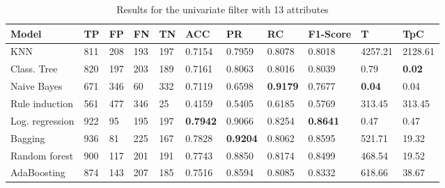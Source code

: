 \documentclass[a4paper,11pt]{article}
\begin{document}
\begin{table}
\centering

\begin{tabular}{|l|l|l|l|l|l|l|l|l|l|l|}
\hline

\textbf{Model} & \textbf{TP} & \textbf{FP} & \textbf{FN} & \textbf{TN} & \textbf{ACC} & \textbf{PR} & \textbf{RC} & \textbf{F1-Score} & \textbf{T} & \textbf{TpC} \\ \hline
KNN & 811 & 208 & 193 & 197 & 0.7154 & 0.7959 & 0.8078 & 0.8018 & 4257.21 & 2128.61 \\ \hline
Class. Tree & 820 & 197 & 203 & 189 & 0.7161 & 0.8063 & 0.8016 & 0.8039 & 0.79 & \textbf{0.02} \\ \hline
Naive Bayes & 671 & 346 & 60 & 332 & 0.7119 & 0.6598 & \textbf{0.9179} & 0.7677 & \textbf{0.04} & 0.04 \\ \hline
Rule induction & 561 & 477 & 346 & 25 & 0.4159 & 0.5405 & 0.6185 & 0.5769 & 313.45 & 313.45 \\ \hline
Log. regression & 922 & 95 & 195 & 197 & \textbf{0.7942} & 0.9066 & 0.8254 & \textbf{0.8641} & 0.47 & 0.47 \\ \hline
Bagging & 936 & 81 & 225 & 167 & 0.7828 & \textbf{0.9204} & 0.8062 & 0.8595 & 521.71 & 19.32 \\ \hline
Random forest & 900 & 117 & 201 & 191 & 0.7743 & 0.8850 & 0.8174 & 0.8499 & 468.54 & 19.52 \\ \hline
AdaBoosting & 874 & 143 & 207 & 185 & 0.7516 & 0.8594 & 0.8085 & 0.8332 & 618.66 & 38.67 \\ \hline

\end{tabular}
\caption{Results for the univariate filter with 13 attributes}
\label{class:f50u}
\end{table}
\end{document}
